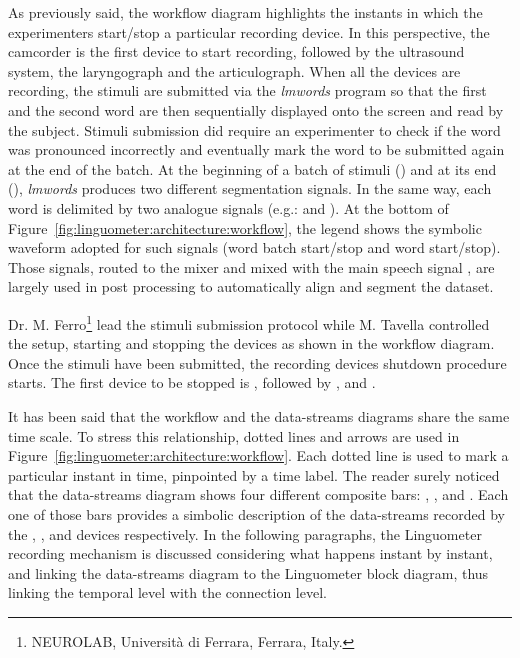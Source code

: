 As previously said, the workflow diagram highlights the instants in which the
experimenters start/stop a particular recording device.
In this perspective, the camcorder is the first device to start recording,
followed by the ultrasound system, the laryngograph and the articulograph.
When all the devices are recording, the stimuli are submitted via 
the \emph{lmwords} program so that the first and the second word are then 
sequentially displayed onto the screen and read by the subject.
Stimuli submission did require an experimenter to check if the word was
pronounced incorrectly and 
eventually mark the word to be submitted again at the
end of the batch.
At the beginning of a batch of stimuli () and at its end 
(), \emph{lmwords} produces two different segmentation signals.
In the same way, each word is delimited by two analogue signals 
(e.g.:  and ).
At the bottom of Figure~\ref{fig:linguometer:architecture:workflow}, 
the legend shows the symbolic waveform adopted for such signals (word batch
start/stop and word start/stop).
Those signals, routed to the  mixer and mixed with the main speech
signal , are largely used in post processing to automatically align 
and segment the dataset.

Dr. M. Ferro\footnote{NEUROLAB, Universit\`a di Ferrara, Ferrara, Italy.} lead
the stimuli submission protocol while M. Tavella controlled the
setup, starting and stopping the devices as shown in the workflow diagram.
Once the stimuli have been submitted, the recording devices shutdown procedure
starts.
The first device to be stopped is , followed by ,  and
.


It has been said that the workflow and the data-streams diagrams share the 
same time scale. To stress this relationship, dotted lines and arrows 
are used in Figure~\ref{fig:linguometer:architecture:workflow}.
Each dotted line is used to mark a particular instant in time, pinpointed by a
time label.
The reader surely noticed that the data-streams diagram shows four different 
composite bars: , ,  and .
Each one of those bars provides a simbolic description of the data-streams 
recorded by the , ,  and  devices respectively.
In the following paragraphs, the Linguometer recording mechanism is discussed
considering what happens instant by instant, and linking the data-streams
diagram to the Linguometer block diagram, thus linking the temporal level with
the connection level.


